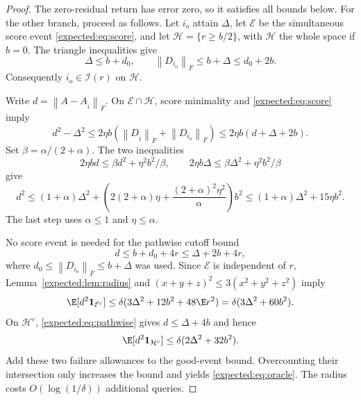 \documentclass[11pt,oneside,openany,a4paper]{book}
\numberwithin{equation}{chapter}
\theoremstyle{definition}
\theoremstyle{remark}
\newcommand{\F}[1]{\left\lVert#1\right\rVert_F}
\begin{document}
\begin{proof}
The zero-residual return has error zero, so it satisfies all bounds
below. For the other branch, proceed as follows.
Let $i_o$ attain $\Delta$, let $\mathcal E$ be the simultaneous score
event \eqref{expected:eq:score}, and let $\mathcal H=\{r\ge b/2\}$, with
$\mathcal H$ the whole space if $b=0$.
The triangle inequalities give
\[
 \Delta\le b+d_0,\qquad
 \F{D_{i_o}}\le b+\Delta\le d_0+2b.
\]
Consequently $i_o\in\mathcal I(r)$ on $\mathcal H$.

Write $d=\F{A-A_{\widehat i}}$. On $\mathcal E\cap\mathcal H$,
score minimality and \eqref{expected:eq:score} imply
\begin{equation}\label{expected:eq:comparison}
 d^2-\Delta^2
 \le2\eta b(\F{D_{\widehat i}}+\F{D_{i_o}})
 \le2\eta b(d+\Delta+2b).
\end{equation}
Set $\beta=\alpha/(2+\alpha)$. The two inequalities
\[
 2\eta bd\le\beta d^2+\eta^2b^2/\beta,
 \qquad
 2\eta b\Delta\le\beta\Delta^2+\eta^2b^2/\beta
\]
give
\[
 d^2\le(1+\alpha)\Delta^2
 +\left(2(2+\alpha)\eta+
             \frac{(2+\alpha)^2\eta^2}{\alpha}\right)b^2
 \le(1+\alpha)\Delta^2+15\eta b^2.
\]
The last step uses $\alpha\le1$ and $\eta\le\alpha$.

No score event is needed for the pathwise cutoff bound
\begin{equation}\label{expected:eq:pathwise}
 d\le b+d_0+4r\le\Delta+2b+4r,
\end{equation}
where $d_0\le\F{D_{i_o}}\le b+\Delta$ was used.
Since $\mathcal E$ is independent of $r$, Lemma~\ref{expected:lem:radius}
and $(x+y+z)^2\le3(x^2+y^2+z^2)$ imply
\[
 \E[d^2\mathbf1_{\mathcal E^c}]
 \le\delta(3\Delta^2+12b^2+48\E r^2)
 =\delta(3\Delta^2+60b^2).
\]
On $\mathcal H^c$, \eqref{expected:eq:pathwise} gives
$d\le\Delta+4b$ and hence
\[
 \E[d^2\mathbf1_{\mathcal H^c}]
 \le\delta(2\Delta^2+32b^2).
\]
Add these two failure allowances to the good-event bound.
Overcounting their intersection only increases the bound and yields
\eqref{expected:eq:oracle}. The radius costs $O(\log(1/\delta))$
additional queries.
\end{proof}
\end{document}
